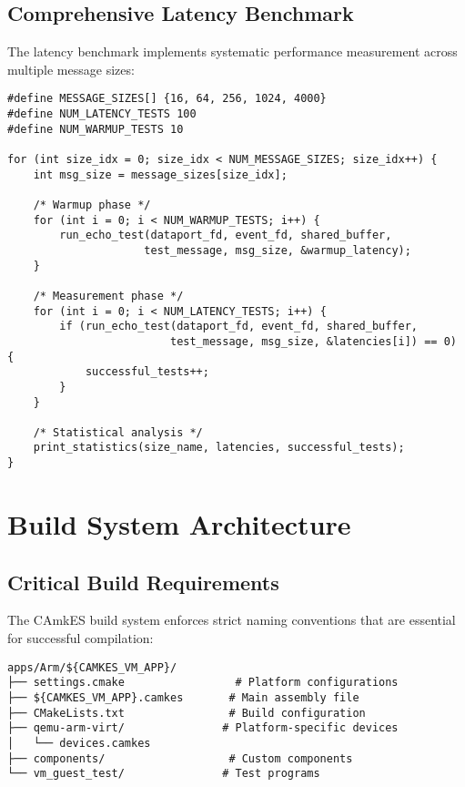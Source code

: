 \documentclass[12pt,a4paper]{article}
\begin{document}
\subsection{Comprehensive Latency Benchmark}

The latency benchmark implements systematic performance measurement across multiple message sizes:

\begin{lstlisting}[style=camkes, caption=Latency benchmark message size testing]
#define MESSAGE_SIZES[] {16, 64, 256, 1024, 4000}
#define NUM_LATENCY_TESTS 100
#define NUM_WARMUP_TESTS 10

for (int size_idx = 0; size_idx < NUM_MESSAGE_SIZES; size_idx++) {
    int msg_size = message_sizes[size_idx];
    
    /* Warmup phase */
    for (int i = 0; i < NUM_WARMUP_TESTS; i++) {
        run_echo_test(dataport_fd, event_fd, shared_buffer, 
                     test_message, msg_size, &warmup_latency);
    }
    
    /* Measurement phase */
    for (int i = 0; i < NUM_LATENCY_TESTS; i++) {
        if (run_echo_test(dataport_fd, event_fd, shared_buffer, 
                         test_message, msg_size, &latencies[i]) == 0) {
            successful_tests++;
        }
    }
    
    /* Statistical analysis */
    print_statistics(size_name, latencies, successful_tests);
}
\end{lstlisting}

\section{Build System Architecture}

\subsection{Critical Build Requirements}

The CAmkES build system enforces strict naming conventions that are essential for successful compilation:

\begin{lstlisting}[style=bash, caption=Build system folder structure requirements]
apps/Arm/${CAMKES_VM_APP}/
├── settings.cmake                 # Platform configurations
├── ${CAMKES_VM_APP}.camkes       # Main assembly file  
├── CMakeLists.txt                # Build configuration
├── qemu-arm-virt/               # Platform-specific devices
│   └── devices.camkes
├── components/                   # Custom components
└── vm_guest_test/               # Test programs
\end{lstlisting}
\end{document}
